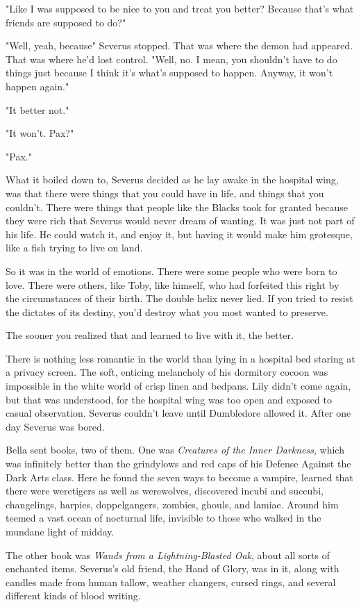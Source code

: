 "Like I was supposed to be nice to you and treat you better? Because that's what friends are supposed to do?"

"Well, yeah, because{\el}" Severus stopped. That was where the demon had appeared. That was where he'd lost control. "Well, no. I mean, you shouldn't have to do things just because I think it's what's supposed to happen. Anyway, it won't happen again."

"It better not."

"It won't. Pax?"

"Pax."

What it boiled down to, Severus decided as he lay awake in the hospital wing, was that there were things that you could have in life, and things that you couldn't. There were things that people like the Blacks took for granted because they were rich that Severus would never dream of wanting. It was just not part of his life. He could watch it, and enjoy it, but having it would make him grotesque, like a fish trying to live on land.

So it was in the world of emotions. There were some people who were born to love. There were others, like Toby, like himself, who had forfeited this right by the circumstances of their birth. The double helix never lied. If you tried to resist the dictates of its destiny, you'd destroy what you most wanted to preserve.

The sooner you realized that and learned to live with it, the better.

There is nothing less romantic in the world than lying in a hospital bed staring at a privacy screen. The soft, enticing melancholy of his dormitory cocoon was impossible in the white world of crisp linen and bedpans. Lily didn't come again, but that was understood, for the hospital wing was too open and exposed to casual observation. Severus couldn't leave until Dumbledore allowed it. After one day Severus was bored.

Bella sent books, two of them. One was \emph{Creatures of the Inner Darkness}, which was infinitely better than the grindylows and red caps of his Defense Against the Dark Arts class. Here he found the seven ways to become a vampire, learned that there were weretigers as well as werewolves, discovered incubi and succubi, changelings, harpies, doppelgangers, zombies, ghouls, and lamiae. Around him teemed a vast ocean of nocturnal life, invisible to those who walked in the mundane light of midday.

The other book was \emph{Wands from a Lightning-Blasted Oak}, about all sorts of enchanted items. Severus's old friend, the Hand of Glory, was in it, along with candles made from human tallow, weather changers, cursed rings, and several different kinds of blood writing.

